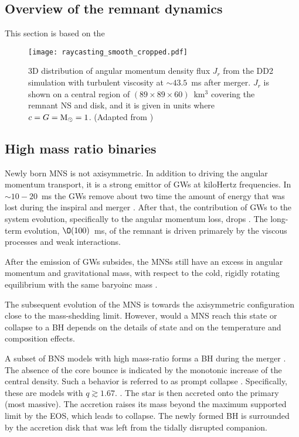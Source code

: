 \subsection{Overview of the remnant dynamics}
\label{sec:bns_dynsmics_overview}


This section is based on the \cite{Nedora:2020pak}


\begin{figure}[t]
    \centering
    \texttt{[image: raycasting\_smooth\_cropped.pdf]}
    \caption{3D distribution of angular momentum density flux $J_r$
        from the DD2 simulation with turbulent viscosity at ${\sim}43.5$~ms after
        merger. $J_r$ is shown on a central region of
        $(89\times89\times60)$~km${}^3$ covering the remnant NS
        and disk, and it is given in units where $c=G={\text{M}_{\odot}}=1$.
        (Adapted from \citet{Nedora:2019jhl})
    }
    \label{fig:ang_mom_flux}
\end{figure}

\subsection{High mass ratio binaries}

Newly born \ac{MNS} is not axisymmetric. In addition to driving the angular 
momentum transport, it is a strong emittor of \acp{GW} at kiloHertz frequencies.
In ${\sim}10-20$~ms \pmerg{} the \acp{GW} remove about two time the 
amount of energy that was lost during the inspiral and merger \citep{Bernuzzi:2015opx}.
After that, the contribution of \acp{GW} to the system evolution, specifically to the angular momentum loss, drops \citep{Radice:2018xqa}. 
The long-term evolution, $\O(100)$~ms, of the remnant is driven primarely by the viscous processes and weak interactions.

After the emission of \acp{GW} subsides, the \acp{MNS} still have an excess in angular momentum and gravitational mass, with respect to the cold, rigidly rotating equilibrium with the same baryoinc mass \citep{Radice:2018xqa}.

The subsequent evolution of the \ac{MNS} is towards the axisymmetric configuration close to the mass-shedding limit. However, would a \ac{MNS} reach this state or collapse to a \ac{BH} depends on the details of \pmerg{} state and on the temperature and composition effects.


A subset of \ac{BNS} models with high mass-ratio forms a \ac{BH} 
during the merger \cite{Bernuzzi:2020txg}. The absence of the core bounce
is indicated by the monotonic increase of the central density.
Such a behavior is referred to as prompt collapse \citep{Radice:2020ddv,Bernuzzi:2020tgt,Bernuzzi:2020txg}.
Specifically, these are models with $q\gtrsim1.67$. 
. The star is then accreted onto the primary (most massive). 
The accretion raises its mass beyond the maximum supported limit by the \ac{EOS}, which leads to collapse. 
The newly formed \ac{BH} is surrounded by the accretion disk that was left from the tidally disrupted companion.

